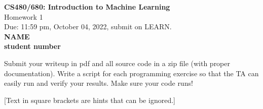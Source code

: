 \documentclass[10pt,letter,notitlepage]{article}
\newcommand{\red}[1]{{\color{red}#1}}
\newcommand{\green}[1]{{\color{green}#1}}
\begin{document}
\begin{center}
\large{\textbf{CS480/680: Introduction to Machine Learning} \\ Homework 1\\ \red{Due: 11:59 pm, October 04, 2022}, \red{submit on LEARN}.} \\

{\bf \green{NAME}} \\
{\bf \green{student number}}

\end{center}

\begin{center}
Submit your writeup in pdf and all source code in a zip file (with proper documentation). Write a script for each programming exercise so that the TA can easily run and verify your results. Make sure your code runs!

[Text in square brackets are hints that can be ignored.]
\end{center}
\end{document}
